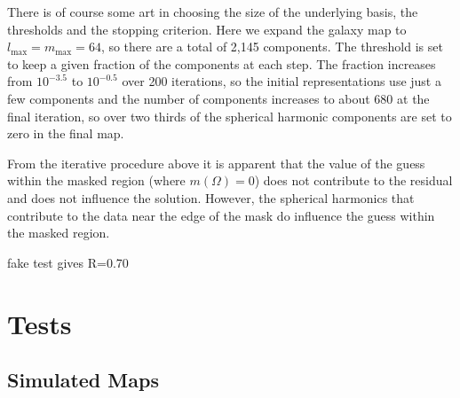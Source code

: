 \documentclass[useAMS,usenatbib]{mn2e}
\begin{document}
There is of course some art in choosing the size of the underlying
basis, the thresholds and the stopping criterion.  Here we expand the
galaxy map to $l_\mathrm{max}=m_\mathrm{max}=64$, so there are a total
of 2,145 components.  The threshold is set to keep a given fraction of
the components at each step.  The fraction increases from $10^{-3.5}$
to $10^{-0.5}$ over 200 iterations, so the initial representations use
just a few components and the number of components increases to about
680 at the final iteration, so over two thirds of the spherical
harmonic components are set to zero in the final map.

From the iterative procedure above it is apparent that the value of
the guess within the masked region (where $m(\Omega)=0$) does not
contribute to the residual and does not influence the solution.
However, the spherical harmonics that contribute to the data near the
edge of the mask do influence the guess within the masked region.

fake test gives R=0.70

\section{Tests}
\label{sec:tests}


\subsection{Simulated Maps}
\label{sec:simulated-maps}
\end{document}
